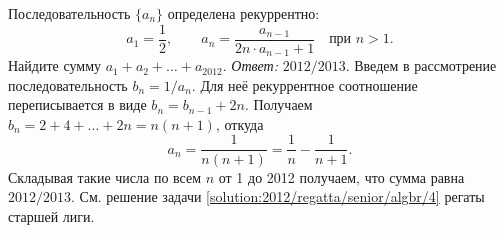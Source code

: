 \problem
Последовательность $\{ a_n \}$ определена рекуррентно:
\[
    a_1 = \frac{1}{2}
,\qquad
    a_n = \frac{a_{n - 1}}{2 n \cdot a_{n - 1} + 1}
    \quad\text{при $n > 1$}
.\]
Найдите сумму $a_1 + a_2 + \ldots + a_{2012}$.
\solution
\label{solution:2012/pers-algbr/junior/2}%
\emph{Ответ:} $2012 / 2013$.
%
Введем в рассмотрение последовательность $b_n = 1 / a_n$.
Для неё рекуррентное соотношение переписывается в виде $b_n = b_{n - 1} + 2 n$.
Получаем
$b_n = 2 + 4 + \ldots + 2 n = n (n + 1)$,
откуда
\[a_n = \frac{1}{n (n + 1)} = \frac{1}{n} - \frac{1}{n + 1}.\]
Складывая такие числа по всем $n$ от 1 до 2012 получаем, что сумма равна
$2012 / 2013$.
\else%
См. решение задачи \ref{solution:2012/regatta/senior/algbr/4} регаты старшей
лиги.
\fi
\endproblem
